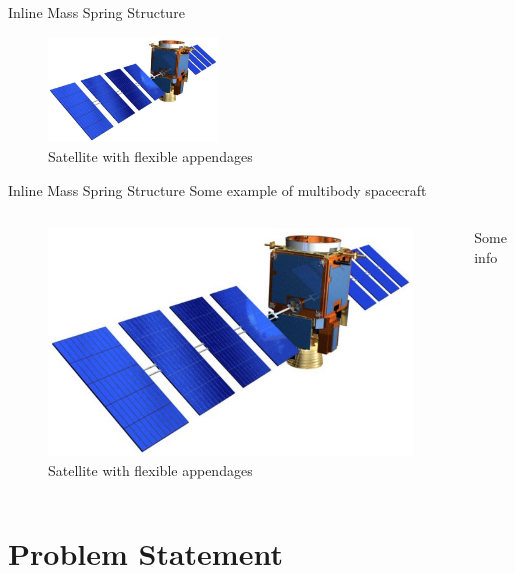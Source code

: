 \documentclass{beamer}
\begin{document}
\begin{frame}{Inline Mass Spring Structure}
\begin{figure}
\includegraphics[width=0.4\textwidth]{images/satellite.jpg}
\caption{Satellite with flexible appendages}
\end{figure}
\end{frame}

\begin{frame}{Inline Mass Spring Structure}
Some example of multibody spacecraft
\begin{columns}
\begin{figure}
\includegraphics[width=\textwidth]{images/satellite.jpg}
\caption{Satellite with flexible appendages}
\end{figure}
Some info
\end{columns}
\end{frame}

\section{Problem Statement}
\end{document}
